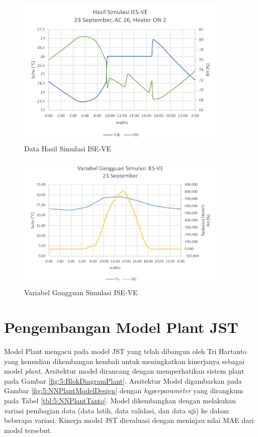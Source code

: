 \begin{figure}[!h]
	\centering
	\includegraphics[width=0.9\textwidth]{figures/HasilSimulasiIESVE}
	\caption{Data Hasil Simulasi ISE-VE}
	\label{fig:5:HasilSimulasiIESVE}
\end{figure}
\vspace{1em}
\break

\begin{figure}[!h]
	\centering
	\includegraphics[width=0.9\textwidth]{figures/LoadSimulasiIESVE}
	\caption{Variabel Gangguan Simulasi ISE-VE}
	\label{fig:5:LoadSimulasiIESVE}
\end{figure}
\vspace{1em}
\break

\section{Pengembangan Model Plant JST}

Model Plant mengacu pada model JST yang telah dibangun oleh Tri Hartanto\cite{skripsiTanto} yang kemudian dikembangan kembali untuk meningkatkan kinerjanya sebagai model \textit{plant}. Arsitektur model dirancang dengan memperhatikan sistem plant pada Gambar \ref{fig:5:BlokDiagramPlant}. Arsitektur Model digambarkan pada Gambar \ref{fig:5:NNPlantModelDesign} dengan \textit{hyperparameter} yang dirangkum pada Tabel \ref{tbl:5:NNPlantTanto}. Model dikembangkan dengan melakukan variasi pembagian data (data latih, data validasi, dan data uji) ke dalam beberapa variasi. Kinerja model JST dievaluasi dengan meninjau nilai MAE dari model tersebut.

